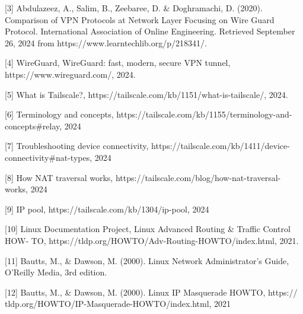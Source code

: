 \documentclass{article}
\begin{document}
[3]  Abdulazeez, A., Salim, B., Zeebaree, D. & Doghramachi, D. (2020). Comparison of VPN Protocols at Network Layer Focusing on Wire Guard Protocol. International Association of Online Engineering. Retrieved September 26, 2024 from https://www.learntechlib.org/p/218341/. 

[4] WireGuard, WireGuard: fast, modern, secure VPN tunnel, https://www.wireguard.com/, 2024.

[5] What is Tailscale?, https://tailscale.com/kb/1151/what-is-tailscale/, 2024.

[6] Terminology and concepts, https://tailscale.com/kb/1155/terminology-and-concepts#relay, 2024

[7] Troubleshooting device connectivity, https://tailscale.com/kb/1411/device-connectivity#nat-types, 2024

[8] How NAT traversal works, https://tailscale.com/blog/how-nat-traversal-works, 2024

[9] IP pool, https://tailscale.com/kb/1304/ip-pool, 2024

[10] Linux Documentation Project, Linux Advanced Routing & Traffic Control HOW-
TO, https://tldp.org/HOWTO/Adv-Routing-HOWTO/index.html, 2021.  

[11] Bautts, M., & Dawson, M. (2000). Linux Network Administrator’s Guide, O’Reilly
Media, 3rd edition.

[12] Bautts, M., & Dawson, M. (2000). Linux IP Masquerade HOWTO, https://
tldp.org/HOWTO/IP-Masquerade-HOWTO/index.html, 2021
\end{document}
